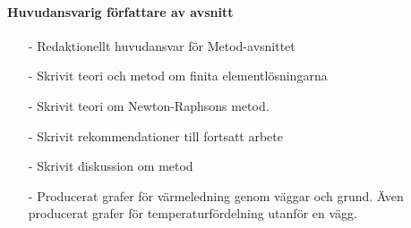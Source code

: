 \documentclass[12pt,a4paper]{article}
\begin{document}
\paragraph{Huvudansvarig författare av avsnitt}

\begin{itemize}
\item[-] Redaktionellt huvudansvar för Metod-avsnittet
\item[-] Skrivit teori och metod om finita elementlösningarna
\item[-] Skrivit teori om Newton-Raphsons metod.
\item[-] Skrivit rekommendationer till fortsatt arbete
\item[-] Skrivit diskussion om metod
\item[-] Producerat grafer för värmeledning genom väggar och grund. Även producerat
grafer för temperaturfördelning utanför en vägg.
\end{itemize}
\end{document}
